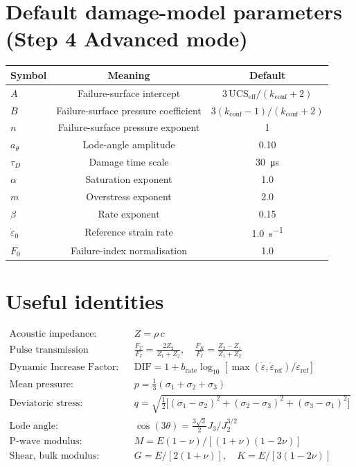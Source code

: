 \documentclass[11pt,a4paper,openany]{book}
\providecommand{\SI}[2]{\qty{#1}{#2}}
\theoremstyle{handbook}
\newcommand{\sig}{\sigma}
\newcommand{\eps}{\varepsilon}
\newcommand{\epsdot}{\dot\eps}
\begin{document}
\section{Default damage-model parameters (Step 4 Advanced mode)}
\begin{center}
\renewcommand{\arraystretch}{1.3}
\begin{tabular}{@{}lcc@{}}
\toprule
\textbf{Symbol} & \textbf{Meaning} & \textbf{Default} \\
\midrule
$A$ & Failure-surface intercept & $3\,\text{UCS}_{\text{eff}}/(k_{\text{conf}}+2)$ \\
$B$ & Failure-surface pressure coefficient & $3(k_{\text{conf}}-1)/(k_{\text{conf}}+2)$ \\
$n$ & Failure-surface pressure exponent & 1 \\
$a_\theta$ & Lode-angle amplitude & 0.10 \\
$\tau_D$ & Damage time scale & \SI{30}{\micro s} \\
$\alpha$ & Saturation exponent & 1.0 \\
$m$ & Overstress exponent & 2.0 \\
$\beta$ & Rate exponent & 0.15 \\
$\epsdot_0$ & Reference strain rate & \SI{1.0}{s^{-1}} \\
$F_0$ & Failure-index normalisation & 1.0 \\
\bottomrule
\end{tabular}
\end{center}

\section{Useful identities}
\begin{align*}
  \text{Acoustic impedance:}\quad & Z=\rho\,c \\
  \text{Pulse transmission (Fresnel):}\quad
    & \frac{F_T}{F_I}=\frac{2Z_2}{Z_1+Z_2},
      \quad \frac{F_R}{F_I}=\frac{Z_2-Z_1}{Z_1+Z_2} \\
  \text{Dynamic Increase Factor:}\quad
    & \text{DIF}=1+b_{\text{rate}}\log_{10}
      \!\left[\max(\epsdot,\epsdot_{\text{ref}})/\epsdot_{\text{ref}}\right] \\
  \text{Mean pressure:}\quad & p=\tfrac{1}{3}(\sig_1+\sig_2+\sig_3) \\
  \text{Deviatoric stress:}\quad
    & q=\sqrt{\tfrac{1}{2}\bigl[(\sig_1-\sig_2)^{2}+(\sig_2-\sig_3)^{2}+(\sig_3-\sig_1)^{2}\bigr]} \\
  \text{Lode angle:}\quad
    & \cos(3\theta)=\tfrac{3\sqrt{3}}{2}J_3/J_2^{3/2} \\
  \text{P-wave modulus:}\quad
    & M=E(1-\nu)/[(1+\nu)(1-2\nu)] \\
  \text{Shear, bulk modulus:}\quad
    & G=E/[2(1+\nu)],\quad K=E/[3(1-2\nu)]
\end{align*}
\end{document}
